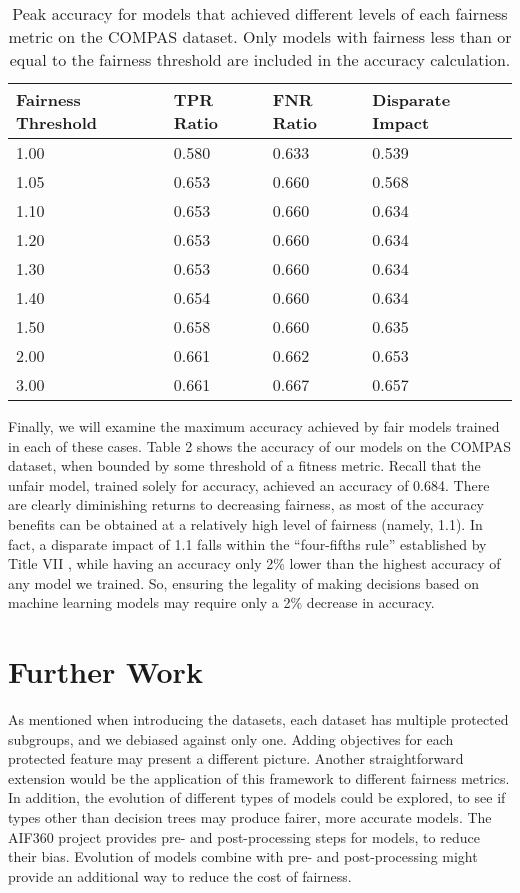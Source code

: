 \documentclass[twoside]{article}
\begin{document}
\renewcommand{\arraystretch}{1.5}
\begin{table}
	\begin{center}
	\begin{tabular}{| l | l | l | l |}
	\hline
	Fairness Threshold & TPR Ratio & FNR Ratio & Disparate Impact \\ \hline
	1.00    & 0.580 & 0.633 & 0.539 \\ \hline
	1.05 & 0.653 & 0.660 & 0.568 \\ \hline
	1.10  & 0.653 & 0.660 & 0.634 \\ \hline
	1.20  & 0.653 & 0.660 & 0.634 \\ \hline
	1.30  & 0.653 & 0.660 & 0.634 \\ \hline
	1.40  & 0.654 & 0.660 & 0.634 \\ \hline
	1.50  & 0.658 & 0.660 & 0.635 \\ \hline
	2.00   & 0.661 & 0.662 & 0.653 \\ \hline
	3.00    & 0.661 & 0.667 & 0.657 \\ \hline
	\end{tabular}
	\end{center}
\caption{Peak accuracy for models that achieved different levels of each fairness metric on the COMPAS dataset. Only models with fairness less than or equal to the fairness threshold are included in the accuracy calculation.}
\end{table}

Finally, we will examine the maximum accuracy achieved by fair models trained in each of these cases. Table 2 shows the accuracy of our models on the COMPAS dataset, when bounded by some threshold of a fitness metric. Recall that the unfair model, trained solely for accuracy, achieved an accuracy of 0.684. There are clearly diminishing returns to decreasing fairness, as most of the accuracy benefits can be obtained at a relatively high level of fairness (namely, 1.1). In fact, a disparate impact of 1.1 falls within the “four-fifths rule” established by Title VII \citep{Barocas:2016}, while having an accuracy only 2\% lower than the highest accuracy of any model we trained. So, ensuring the legality of making decisions based on machine learning models may require only a 2\% decrease in accuracy.

\section{Further Work}
As mentioned when introducing the datasets, each dataset has multiple protected subgroups, and we debiased against only one. Adding objectives for each protected feature may present a different picture. Another straightforward extension would be the application of this framework to different fairness metrics. In addition, the evolution of different types of models could be explored, to see if types other than decision trees may produce fairer, more accurate models. The AIF360 project provides pre- and post-processing steps for models, to reduce their bias. Evolution of models combine with pre- and post-processing might provide an additional way to reduce the cost of fairness.
\end{document}
